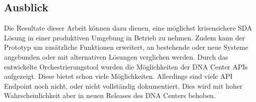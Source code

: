 \subsection{Ausblick}
Die Resultate dieser Arbeit können dazu dienen, eine möglichst krisensichere SDA Lösung in einer produktiven Umgebung in Betrieb zu nehmen. Zudem kann der Prototyp um zusätzliche Funktionen erweitert, an bestehende oder neue Systeme angebunden oder mit alternativen Lösungen verglichen werden. Durch das entwickelte Orchestrierungstool wurden die Möglichkeiten der DNA Center APIs aufgezeigt. Diese bietet schon viele Möglichkeiten. Allerdings sind viele API Endpoint noch nicht, oder nicht vollständig dokumentiert. Dies wird mit hoher Wahrscheinlichkeit aber in neuen Releases des DNA Centers behoben.
